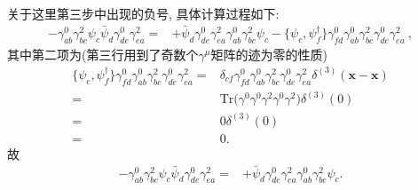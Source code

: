 关于这里第三步中出现的负号, 具体计算过程如下:
\begin{equation*}
  \begin{aligned}
    -\gamma^0_{ab}\gamma^2_{bc}\psi_c\bar{\psi}_d\gamma^0_{de}\gamma^2_{ea} = & +\bar{\psi}_d \gamma^0_{de}\gamma^2_{ea}\gamma^0_{ab}\gamma^2_{bc}\psi_c - \bigl\{\psi_c,\psi_f^\dagger\bigr\}\gamma^0_{fd} \gamma^0_{ab}\gamma^2_{bc}\gamma^0_{de}\gamma^2_{ea}\ ,
  \end{aligned}
\end{equation*}
其中第二项为(第三行用到了奇数个$\gamma^{\mu}$矩阵的迹为零的性质)
\begin{equation*}
  \begin{aligned}
    \bigl\{\psi_c,\psi_f^\dagger\bigr\}\gamma^0_{fd} \gamma^0_{ab}\gamma^2_{bc}\gamma^0_{de}\gamma^2_{ea} = & \delta_{cf}\gamma^0_{fd}\gamma^0_{ab}\gamma^2_{bc}\gamma^0_{de}\gamma^2_{ea}\delta^{(3)}(\mathbf{x}-\mathbf{x}) \\
    =                                                                                                       & \mathrm{Tr}\bigl(\gamma^0 \gamma^0 \gamma^2 \gamma^0 \gamma^2\bigr)\delta^{(3)}(0)                              \\
    =                                                                                                       & 0 \delta^{(3)}(0)                                                                                               \\
    =                                                                                                       & 0.
  \end{aligned}
\end{equation*}
故
\begin{equation*}
  \begin{aligned}
    -\gamma^0_{ab}\gamma^2_{bc}\psi_c\bar{\psi}_d\gamma^0_{de}\gamma^2_{ea} = & +\bar{\psi}_d \gamma^0_{de}\gamma^2_{ea}\gamma^0_{ab}\gamma^2_{bc}\psi_c.
  \end{aligned}
\end{equation*}

\clearpage
{}
